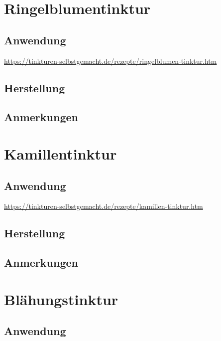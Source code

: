 \section{Ringelblumentinktur}

\subsection{Anwendung}

\cite{tinkturen}  \url{https://tinkturen-selbstgemacht.de/rezepte/ringelblumen-tinktur.htm}

\subsection{Herstellung}

\subsection{Anmerkungen}






\section{Kamillentinktur}

\subsection{Anwendung}

\cite{tinkturen}  \url{https://tinkturen-selbstgemacht.de/rezepte/kamillen-tinktur.htm}

\subsection{Herstellung}

\subsection{Anmerkungen}







\section{Blähungstinktur}

\subsection{Anwendung}


